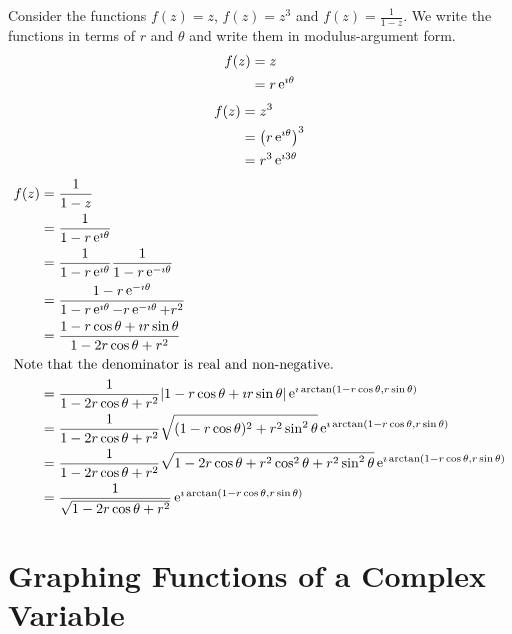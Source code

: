 \begin{Example}
  Consider the functions $f(z) = z$, $f(z) = z^3$ and $f(z) = \frac{1}{1-z}$.
  We write the functions in terms of $r$ and $\theta$ and 
  write them in modulus-argument form.
  \begin{align*}
    f(z)    
    &= z 
    \\
    &= r \mathop{\mathrm{e}}\nolimits^{\imath \theta}
  \end{align*}
  \begin{align*}
    f(z)    
    &= z^3 
    \\
    &= \left( r \mathop{\mathrm{e}}\nolimits^{\imath \theta} \right)^3 
    \\
    &= r^3 \mathop{\mathrm{e}}\nolimits^{\imath 3 \theta}
  \end{align*}
  \begin{align*}
    f(z)    
    &= \frac{1}{1-z} 
    \\
    &= \frac{1}{1 - r \mathop{\mathrm{e}}\nolimits^{\imath \theta}} 
    \\
    &= \frac{1}{1 - r \mathop{\mathrm{e}}\nolimits^{\imath \theta}}  \frac{1}{1 - r \mathop{\mathrm{e}}\nolimits^{-\imath \theta}} 
    \\
    &= \frac{1 - r \mathop{\mathrm{e}}\nolimits^{-\imath \theta}}{1 - r \mathop{\mathrm{e}}\nolimits^{\imath \theta} - r \mathop{\mathrm{e}}\nolimits^{-\imath \theta} + r^2} 
    \\
    &= \frac{1 - r \cos \theta + \imath r \sin \theta}{1 - 2 r \cos \theta + r^2} 
    \\
    \intertext{Note that the denominator is real and non-negative.}
    &= \frac{1} {1 - 2 r \cos \theta + r^2}  | 1 - r \cos \theta + \imath r \sin \theta | 
    \mathop{\mathrm{e}}\nolimits^{\imath \arctan(1 - r \cos \theta, r \sin \theta)} 
    \\
    &= \frac{1} {1 - 2 r \cos \theta + r^2}  \sqrt{ (1 - r \cos \theta)^2 + r^2 \sin^2 \theta } 
     \mathop{\mathrm{e}}\nolimits^{\imath \arctan(1 - r \cos \theta, r \sin \theta)} 
    \\
    &= \frac{1} {1 - 2 r \cos \theta + r^2} 
    \sqrt{ 1 - 2 r \cos \theta + r^2 \cos^2 \theta + r^2 \sin^2 \theta } 
    \mathop{\mathrm{e}}\nolimits^{\imath \arctan(1 - r \cos \theta, r \sin \theta)} 
    \\
    &= \frac{1}{ \sqrt{ 1 - 2 r \cos \theta + r^2 } }  \mathop{\mathrm{e}}\nolimits^{\imath \arctan(1 - r \cos \theta, r \sin \theta)} 
  \end{align*}
\end{Example}









\section{Graphing Functions of a Complex Variable}




